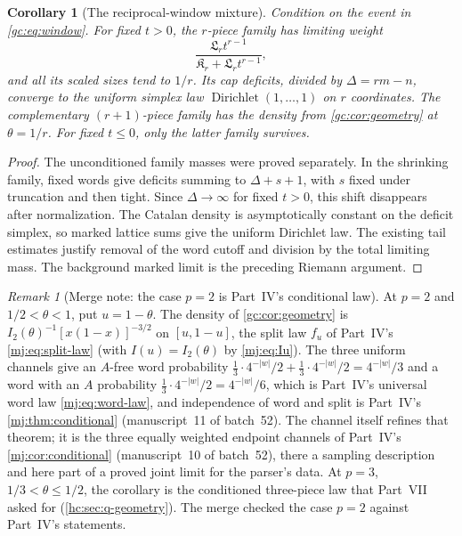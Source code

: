 \documentclass[11pt,a4paper]{article}
\newtheorem{corollary}[corollary]{Corollary}
\theoremstyle{definition}\newaliascnt{definition}{theorem}
\theoremstyle{remark}\newaliascnt{remark}{theorem}
\newtheorem{remark}[remark]{Remark}
\begin{document}
\begin{corollary}[The reciprocal-window mixture]\label{gc:cor:mixture}
Condition on the event in \eqref{gc:eq:window}. For fixed $t>0$, the $r$-piece
family has limiting weight
\[
 \frac{\mathfrak L_rt^{r-1}}{\mathfrak K_r+\mathfrak L_rt^{r-1}},
\]
and all its scaled sizes tend to $1/r$. Its cap deficits, divided by
$\Delta=rm-n$, converge to the uniform simplex law
$\operatorname{Dirichlet}(1,\ldots,1)$ on $r$ coordinates. The complementary
$(r+1)$-piece family has the density from \cref{gc:cor:geometry} at
$\theta=1/r$. For fixed $t\le0$, only the latter family survives.
\end{corollary}
\begin{proof}
The unconditioned family masses were proved separately. In the shrinking
family, fixed words give deficits summing to $\Delta+s+1$, with $s$ fixed under
truncation and then tight. Since $\Delta\to\infty$ for fixed $t>0$, this shift
disappears after normalization. The Catalan density is asymptotically constant
on the deficit simplex, so marked lattice sums give the uniform Dirichlet law.
The existing tail estimates justify removal of the word cutoff and division by
the total limiting mass. The background marked limit is the preceding Riemann
argument.
\end{proof}

\begin{remark}[Merge note: the case $p=2$ is Part~IV's conditional law]
\label{gc:rem:geometry}
At $p=2$ and $1/2<\theta<1$, put $u=1-\theta$. The density of
\cref{gc:cor:geometry} is $I_2(\theta)^{-1}[x(1-x)]^{-3/2}$ on $[u,1-u]$, the
split law $f_u$ of Part~IV's \eqref{mj:eq:split-law} (with $I(u)=I_2(\theta)$
by \eqref{mj:eq:Iu}). The three uniform channels give an $A$-free word
probability $\tfrac13\cdot4^{-|w|}/2+\tfrac13\cdot4^{-|w|}/2=4^{-|w|}/3$ and a
word with an $A$ probability $\tfrac13\cdot4^{-|w|}/2=4^{-|w|}/6$, which is
Part~IV's universal word law \eqref{mj:eq:word-law}, and independence of word
and split is Part~IV's \cref{mj:thm:conditional} (manuscript~11 of batch~52).
The channel itself refines that theorem; it is the three equally weighted
endpoint channels of Part~IV's \cref{mj:cor:conditional} (manuscript~10 of
batch~52), there a sampling description and here part of a proved joint limit
for the parser's data. At $p=3$, $1/3<\theta\le1/2$, the corollary is the
conditioned three-piece law that Part~VII asked for (\cref{hc:sec:q-geometry}).
The merge checked the case $p=2$ against Part~IV's statements.
\end{remark}
\end{document}

